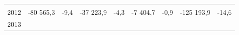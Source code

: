 \begin{longtable}[]{@{}lllllllll@{}}
\begin{minipage}[t]{0.12\columnwidth}
\strut
\end{minipage} & \begin{minipage}[t]{0.06\columnwidth}\raggedright
\strut
\end{minipage} & \begin{minipage}[t]{0.09\columnwidth}\raggedright
\strut
\end{minipage} & \begin{minipage}[t]{0.06\columnwidth}\raggedright
\strut
\end{minipage}\tabularnewline
\begin{minipage}[t]{0.05\columnwidth}\raggedright
2012\strut
\end{minipage} & \begin{minipage}[t]{0.10\columnwidth}\raggedright
-80 565,3\strut
\end{minipage} & \begin{minipage}[t]{0.06\columnwidth}\raggedright
-9,4\strut
\end{minipage} & \begin{minipage}[t]{0.16\columnwidth}\raggedright
-37 223,9\strut
\end{minipage} & \begin{minipage}[t]{0.06\columnwidth}\raggedright
-4,3\strut
\end{minipage} & \begin{minipage}[t]{0.12\columnwidth}\raggedright
-7 404,7\strut
\end{minipage} & \begin{minipage}[t]{0.06\columnwidth}\raggedright
-0,9\strut
\end{minipage} & \begin{minipage}[t]{0.09\columnwidth}\raggedright
-125 193,9\strut
\end{minipage} & \begin{minipage}[t]{0.06\columnwidth}\raggedright
-14,6\strut
\end{minipage}\tabularnewline
\begin{minipage}[t]{0.05\columnwidth}\raggedright
2013\strut
\end{minipage} & \begin{minipage}[t]{0.10\columnwidth}\raggedright
\strut
\end{minipage} & \begin{minipage}[t]{0.06\columnwidth}\raggedright
\strut
\end{minipage} & \begin{minipage}[t]{0.16\columnwidth}\raggedright
\strut
\end{minipage} & \begin{minipage}[t]{0.06\columnwidth}\raggedright

\end{minipage}
\end{longtable}
